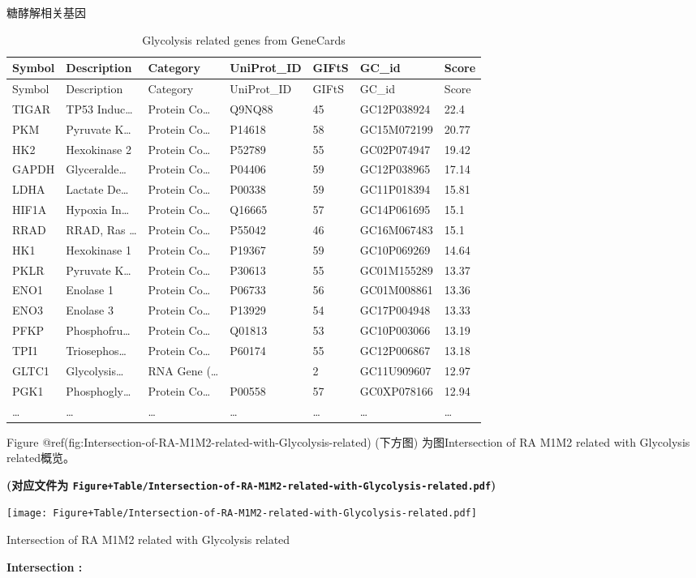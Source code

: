 \documentclass[
  ignorenonframetext,
]{beamer}
\begin{document}
\begin{frame}[fragile]{糖酵解相关基因}
\begin{longtable}[]{@{}lllllll@{}}
\caption{Glycolysis related genes from GeneCards}\tabularnewline
\toprule
Symbol & Description & Category & UniProt\_ID & GIFtS & GC\_id &
Score\tabularnewline
\midrule
\endfirsthead
\toprule
Symbol & Description & Category & UniProt\_ID & GIFtS & GC\_id &
Score\tabularnewline
\midrule
\endhead
TIGAR & TP53 Induc\ldots{} & Protein Co\ldots{} & Q9NQ88 & 45 &
GC12P038924 & 22.4\tabularnewline
PKM & Pyruvate K\ldots{} & Protein Co\ldots{} & P14618 & 58 &
GC15M072199 & 20.77\tabularnewline
HK2 & Hexokinase 2 & Protein Co\ldots{} & P52789 & 55 & GC02P074947 &
19.42\tabularnewline
GAPDH & Glyceralde\ldots{} & Protein Co\ldots{} & P04406 & 59 &
GC12P038965 & 17.14\tabularnewline
LDHA & Lactate De\ldots{} & Protein Co\ldots{} & P00338 & 59 &
GC11P018394 & 15.81\tabularnewline
HIF1A & Hypoxia In\ldots{} & Protein Co\ldots{} & Q16665 & 57 &
GC14P061695 & 15.1\tabularnewline
RRAD & RRAD, Ras \ldots{} & Protein Co\ldots{} & P55042 & 46 &
GC16M067483 & 15.1\tabularnewline
HK1 & Hexokinase 1 & Protein Co\ldots{} & P19367 & 59 & GC10P069269 &
14.64\tabularnewline
PKLR & Pyruvate K\ldots{} & Protein Co\ldots{} & P30613 & 55 &
GC01M155289 & 13.37\tabularnewline
ENO1 & Enolase 1 & Protein Co\ldots{} & P06733 & 56 & GC01M008861 &
13.36\tabularnewline
ENO3 & Enolase 3 & Protein Co\ldots{} & P13929 & 54 & GC17P004948 &
13.33\tabularnewline
PFKP & Phosphofru\ldots{} & Protein Co\ldots{} & Q01813 & 53 &
GC10P003066 & 13.19\tabularnewline
TPI1 & Triosephos\ldots{} & Protein Co\ldots{} & P60174 & 55 &
GC12P006867 & 13.18\tabularnewline
GLTC1 & Glycolysis\ldots{} & RNA Gene (\ldots{} & & 2 & GC11U909607 &
12.97\tabularnewline
PGK1 & Phosphogly\ldots{} & Protein Co\ldots{} & P00558 & 57 &
GC0XP078166 & 12.94\tabularnewline
\ldots{} & \ldots{} & \ldots{} & \ldots{} & \ldots{} & \ldots{} &
\ldots{}\tabularnewline
\bottomrule
\end{longtable}

Figure @ref(fig:Intersection-of-RA-M1M2-related-with-Glycolysis-related)
(下方图) 为图Intersection of RA M1M2 related with Glycolysis
related概览。

\textbf{(对应文件为
\texttt{Figure+Table/Intersection-of-RA-M1M2-related-with-Glycolysis-related.pdf})}

\def\@captype{figure}
\begin{center}
\texttt{[image: Figure+Table/Intersection-of-RA-M1M2-related-with-Glycolysis-related.pdf]}
\caption{Intersection of RA M1M2 related with Glycolysis related}\label{fig:Intersection-of-RA-M1M2-related-with-Glycolysis-related}
\end{center}
\begin{center}\begin{tcolorbox}[colback=gray!10, colframe=gray!50, width=0.9\linewidth, arc=1mm, boxrule=0.5pt]
\textbf{
Intersection
:}


\end{tcolorbox}
\end{center}
\end{frame}
\end{document}

